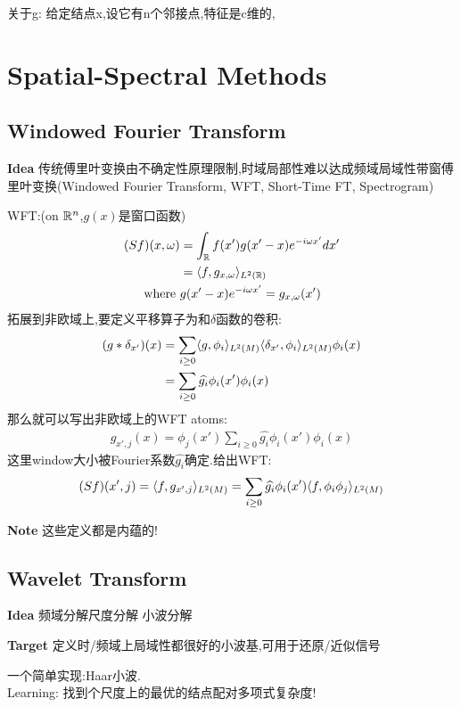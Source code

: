 \documentclass{article}
\begin{document}
关于g: 给定结点x,设它有n个邻接点,特征是c维的,

\section{Spatial-Spectral Methods}

\subsection{Windowed Fourier Transform}

\textbf{Idea} 传统傅里叶变换由不确定性原理限制,时域局部性\tRarr 难以达成频域局域性\tRarr 带窗傅里叶变换(Windowed Fourier Transform, WFT, Short-Time FT, Spectrogram)

WFT:(on $\mathbb{R}^n$,$g(x)$是窗口函数)
\begin{align}
    (Sf)(x,\omega)&=\int_{\mathbb{R}} f(x')g(x'-x)e^{-i\omega x'}dx'\\
    &= \langle f, g_{x,\omega} \rangle_{L^2(\mathbb{R})}\\
    \text{where }&g(x'-x)e^{-i\omega x'}=g_{x,\omega}(x')
\end{align}
拓展到非欧域上,要定义平移算子为和$\delta$函数的卷积:
\begin{align}
    (g*\delta_{x'})(x)&=\sum_{i\ge 0} \langle g, \phi_i \rangle_{L^2(M)} \langle \delta_{x'}, \phi_i \rangle_{L^2(M)} \phi_i(x)\\
    &=\sum_{i\ge 0} \widehat{g_i} \phi_i(x')\phi_i(x)
\end{align}
那么就可以写出非欧域上的WFT atoms:
\begin{align}
    g_{x',j}(x)=\phi_j(x')\sum_{i\ge 0} \widehat{g_i} \phi_i(x')\phi_i(x)
\end{align}
这里window大小被Fourier系数$\widehat{g_i}$确定.给出WFT:
\begin{align}
    (Sf)(x',j)=\langle f, g_{x',j} \rangle_{L^2(M)}=\sum_{i\ge 0} \widehat{g_i} \phi_i(x')\langle f, \phi_i\phi_j \rangle_{L^2(M)}
\end{align}

\textbf{Note} 这些定义都是内蕴的!

\subsection{Wavelet Transform}

\textbf{Idea} 频域分解\tRarr 尺度分解 \tRarr 小波分解

\textbf{Target} 定义时/频域上局域性都很好的小波基,可用于还原/近似信号

一个简单实现:Haar小波.\\
Learning: 找到个尺度上的最优的结点配对\tRarr 多项式复杂度!
\end{document}

